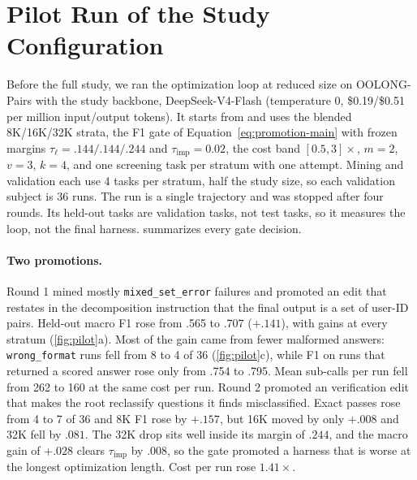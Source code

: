 \providecommand{\shrlm}{\textsc{SH-RLM}\xspace}

\section{Pilot Run of the Study Configuration}
\label{sec:pilot}

Before the full study, we ran the optimization loop at reduced size on OOLONG-Pairs with the study backbone,
DeepSeek-V4-Flash (temperature 0, \$0.19/\$0.51 per million input/output
tokens). It starts from \hzero and uses the blended 8K/16K/32K strata, the F1
gate of Equation~\ref{eq:promotion-main} with frozen margins
$\tau_\ell=.144/.144/.244$ and $\tau_{\mathrm{imp}}{=}0.02$, the cost band
$[0.5,3]\times$, $m{=}2$, $v{=}3$, $k{=}4$, and one screening task per stratum
with one attempt. Mining and validation each use 4 tasks per stratum, half the
study size, so each validation subject is 36 runs. The run is a single
trajectory and was stopped after four rounds. Its held-out tasks are validation
tasks, not test tasks, so it measures the loop, not the final harness.
 summarizes every gate decision.



\paragraph{Two promotions.}
Round 1 mined mostly \texttt{mixed\_set\_error} failures and promoted an
 edit that restates in the decomposition instruction that the final
output is a set of user-ID pairs. Held-out macro F1 rose from .565 to .707
($+.141$), with gains at every stratum (\cref{fig:pilot}a). Most of the gain
came from fewer malformed answers: \texttt{wrong\_format} runs fell from 8 to
4 of 36 (\cref{fig:pilot}c), while F1 on runs that returned a scored answer rose
only from .754 to .795. Mean sub-calls per run fell from 262 to 160 at the same
cost per run. Round 2 promoted an  verification edit that makes the
root reclassify questions it finds misclassified. Exact passes rose from 4 to 7
of 36 and 8K F1 rose by $+.157$, but 16K moved by only $+.008$ and 32K fell by
$.081$. The 32K drop sits well inside its margin of $.244$, and the macro gain
of $+.028$ clears $\tau_{\mathrm{imp}}$ by $.008$, so the gate promoted a
harness that is worse at the longest optimization length. Cost per run rose
$1.41\times$.

